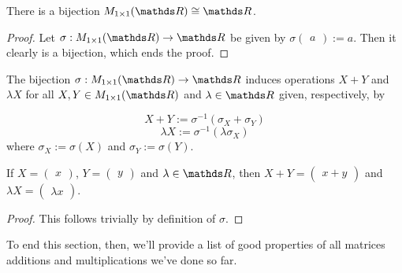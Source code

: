 \begin{prop}
	There is a bijection $M_{1\times 1}(\R)\iso \R$.
\end{prop}
\begin{proof}
	Let $\sigma:M_{1\times 1}(\R)\to \R$ be given by $\sigma\begin{pmatrix}
	a
	\end{pmatrix}:=a$. Then it clearly is a bijection, which ends the proof.
\end{proof}

\begin{df}
	The bijection $\sigma: M_{1\times 1}(\R)\to \R$ induces operations $X+Y$ and $\lambda X$ for all $X,Y\in M_{1\times 1}(\R)$ and $\lambda \in \R$ given, respectively, by
	
	\[X+Y:=\sigma^{-1}(\sigma_X+\sigma_Y)\] 
	\[\lambda X:=\sigma^{-1}(\lambda \sigma_X)\]where $\sigma_X:=\sigma(X)$ and $\sigma_Y:=\sigma(Y)$.
\end{df}

\begin{prop}
	If $X=\begin{pmatrix}
	x
	\end{pmatrix}$, $Y=\begin{pmatrix}
	y
	\end{pmatrix}$ and $\lambda\in \R$, then $X+Y=\begin{pmatrix}
	x+y
	\end{pmatrix}$ and $\lambda X=\begin{pmatrix}
	\lambda x
	\end{pmatrix}$.
\end{prop}
\begin{proof}
	This follows trivially by definition of $\sigma$.
\end{proof}

To end this section, then, we'll provide a list of good properties of all matrices additions and multiplications we've done so far.

